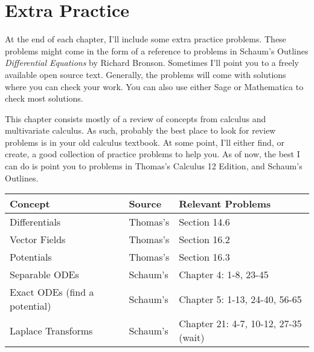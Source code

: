 



\section*{Extra Practice}
At the end of each chapter, I'll include some extra practice problems. These problems might come in the form of a reference to problems in Schaum's Outlines  \textit{Differential Equations} by Richard Bronson. Sometimes I'll point you to a freely available open source text. Generally, the problems will come with solutions where you can check your work.  You can also use either Sage or Mathematica to check most solutions.

This chapter consists mostly of a review of concepts from calculus and multivariate calculus. As such, probably the best place to look for review problems is in your old calculus textbook.  At some point, I'll either find, or create, a good collection of practice problems to help you.  As of now, the best I can do is point you to problems in Thomas's Calculus 12 Edition, and Schaum's Outlines.   
\begin{center}
\begin{tabular}{|l|l|l|}
\hline
Concept                      & Source	             & Relevant Problems\\\hline
Differentials                &Thomas's& Section 14.6\\ \hline
Vector Fields                &Thomas's& Section 16.2\\ \hline
Potentials                   &Thomas's& Section 16.3\\ \hline
Separable ODEs               &Schaum's& Chapter 4: 1-8, 23-45\\ \hline
Exact ODEs (find a potential)&Schaum's& Chapter 5: 1-13, 24-40, 56-65\\ \hline
Laplace Transforms           &Schaum's& Chapter 21: 4-7, 10-12, 27-35 (wait)\\\hline
\end{tabular}
\end{center}

\restoregeometry